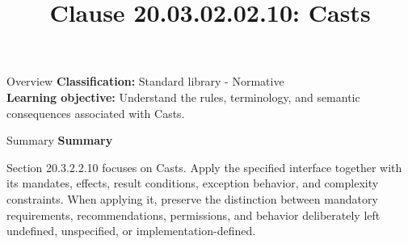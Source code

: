 \documentclass[10pt,letterpaper]{article}
\title{Clause 20.03.02.02.10: Casts}
\author{}
\date{}
\begin{document}
\maketitle
\begin{CornellOverviewBox}{Overview}
\textbf{Classification:} Standard library - Normative\\[2pt]
\textbf{Learning objective:} Understand the rules, terminology, and semantic consequences associated with Casts.
\end{CornellOverviewBox}\begin{CornellSummaryBox}{Summary}
{\sffamily\bfseries\color{Accent} Summary}\par\vspace{3pt}Section 20.3.2.2.10 focuses on Casts. Apply the specified interface together with its mandates, effects, result conditions, exception behavior, and complexity constraints. When applying it, preserve the distinction between mandatory requirements, recommendations, permissions, and behavior deliberately left undefined, unspecified, or implementation-defined.
\end{CornellSummaryBox}
\end{document}
